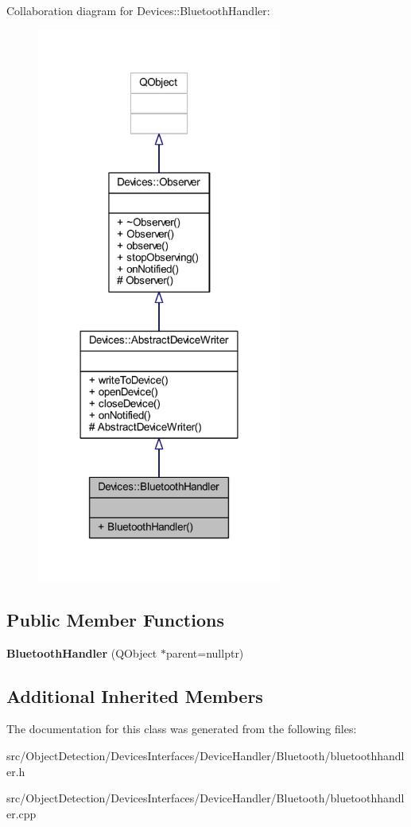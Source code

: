 Collaboration diagram for Devices\+:\+:Bluetooth\+Handler\+:\nopagebreak
\begin{figure}[H]
\begin{center}
\leavevmode
\includegraphics[width=228pt]{dd/ddf/class_devices_1_1_bluetooth_handler__coll__graph}
\end{center}
\end{figure}
\subsection*{Public Member Functions}
\begin{DoxyCompactItemize}
\item 
\mbox{\label{class_devices_1_1_bluetooth_handler_ac277c4c65fe0431d33d5875cc3878379}} 
{\bfseries Bluetooth\+Handler} (Q\+Object $\ast$parent=nullptr)
\end{DoxyCompactItemize}
\subsection*{Additional Inherited Members}


The documentation for this class was generated from the following files\+:\begin{DoxyCompactItemize}
\item 
src/\+Object\+Detection/\+Devices\+Interfaces/\+Device\+Handler/\+Bluetooth/bluetoothhandler.\+h\item 
src/\+Object\+Detection/\+Devices\+Interfaces/\+Device\+Handler/\+Bluetooth/bluetoothhandler.\+cpp\end{DoxyCompactItemize}
